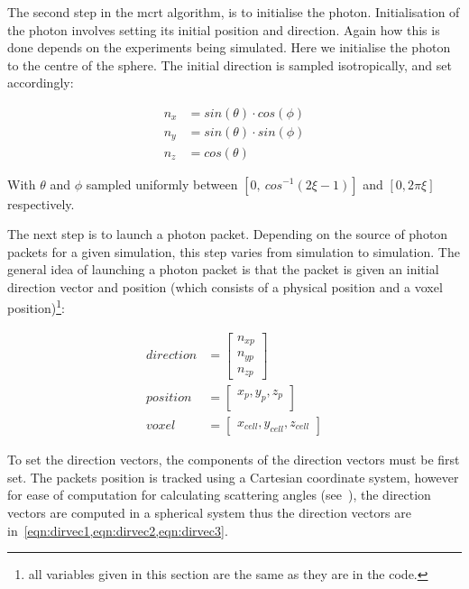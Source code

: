 The second step in the \gls*{mcrt} algorithm, is to initialise the photon. Initialisation of the photon involves setting its initial position and direction. Again how this is done depends on the experiments being simulated. Here we initialise the photon to the centre of the sphere. The initial direction is sampled isotropically, and set accordingly:

\begin{align}
n_{x}&=sin(\theta) \cdot cos(\phi) \label{eqn:dirvec1}\\
n_{y}&=sin(\theta) \cdot sin(\phi) \label{eqn:dirvec2}\\
n_{z}&=cos(\theta) \label{eqn:dirvec3}
\end{align}


With $\theta$ and $\phi$ sampled uniformly between $[0,\ cos^{-1}(2\xi-1)]$ and $[0,2\pi\xi]$ respectively.

The next step is to launch a photon packet. 
Depending on the source of photon packets for a given simulation, this step varies from simulation to simulation. 
The general idea of launching a photon packet is that the packet is given an initial direction vector and position (which consists of a physical position and a voxel position)\footnote{all variables given in this section are the same as they are in the code.}:

\begin{align}
	direction &= \begin{bmatrix}
		n_{xp}\\
		n_{yp}\\
		n_{zp}
	\end{bmatrix}\\
	position &= \begin{bmatrix}
		x_p, y_p, z_p\\
	\end{bmatrix}\\
	voxel &= \begin{bmatrix}
		x_{cell}, y_{cell}, z_{cell}
	\end{bmatrix}	 
\end{align}

To set the direction vectors, the components of the direction vectors must be first set. The packets position is tracked using a Cartesian coordinate system, however for ease of computation for calculating scattering angles (see~), the direction vectors are computed in a spherical system thus the direction vectors are in~\cref{eqn:dirvec1,eqn:dirvec2,eqn:dirvec3}. 

